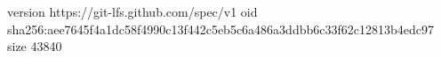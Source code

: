 version https://git-lfs.github.com/spec/v1
oid sha256:aee7645f4a1dc58f4990c13f442c5eb5c6a486a3ddbb6c33f62c12813b4edc97
size 43840
